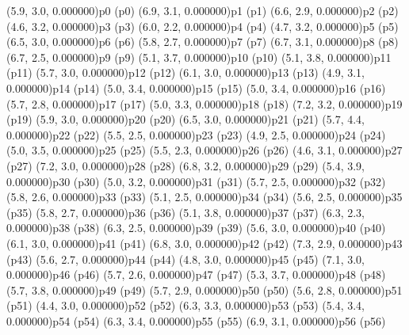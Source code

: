 \psPoint(5.9, 3.0, 0.000000){p0}
\psdot(p0)
\psPoint(6.9, 3.1, 0.000000){p1}
\psdot(p1)
\psPoint(6.6, 2.9, 0.000000){p2}
\psdot(p2)
\psPoint(4.6, 3.2, 0.000000){p3}
\psdot(p3)
\psPoint(6.0, 2.2, 0.000000){p4}
\psdot(p4)
\psPoint(4.7, 3.2, 0.000000){p5}
\psdot(p5)
\psPoint(6.5, 3.0, 0.000000){p6}
\psdot(p6)
\psPoint(5.8, 2.7, 0.000000){p7}
\psdot(p7)
\psPoint(6.7, 3.1, 0.000000){p8}
\psdot(p8)
\psPoint(6.7, 2.5, 0.000000){p9}
\psdot(p9)
\psPoint(5.1, 3.7, 0.000000){p10}
\psdot(p10)
\psPoint(5.1, 3.8, 0.000000){p11}
\psdot(p11)
\psPoint(5.7, 3.0, 0.000000){p12}
\psdot(p12)
\psPoint(6.1, 3.0, 0.000000){p13}
\psdot(p13)
\psPoint(4.9, 3.1, 0.000000){p14}
\psdot(p14)
\psPoint(5.0, 3.4, 0.000000){p15}
\psdot(p15)
\psPoint(5.0, 3.4, 0.000000){p16}
\psdot(p16)
\psPoint(5.7, 2.8, 0.000000){p17}
\psdot(p17)
\psPoint(5.0, 3.3, 0.000000){p18}
\psdot(p18)
\psPoint(7.2, 3.2, 0.000000){p19}
\psdot(p19)
\psPoint(5.9, 3.0, 0.000000){p20}
\psdot(p20)
\psPoint(6.5, 3.0, 0.000000){p21}
\psdot(p21)
\psPoint(5.7, 4.4, 0.000000){p22}
\psdot(p22)
\psPoint(5.5, 2.5, 0.000000){p23}
\psdot(p23)
\psPoint(4.9, 2.5, 0.000000){p24}
\psdot(p24)
\psPoint(5.0, 3.5, 0.000000){p25}
\psdot(p25)
\psPoint(5.5, 2.3, 0.000000){p26}
\psdot(p26)
\psPoint(4.6, 3.1, 0.000000){p27}
\psdot(p27)
\psPoint(7.2, 3.0, 0.000000){p28}
\psdot(p28)
\psPoint(6.8, 3.2, 0.000000){p29}
\psdot(p29)
\psPoint(5.4, 3.9, 0.000000){p30}
\psdot(p30)
\psPoint(5.0, 3.2, 0.000000){p31}
\psdot(p31)
\psPoint(5.7, 2.5, 0.000000){p32}
\psdot(p32)
\psPoint(5.8, 2.6, 0.000000){p33}
\psdot(p33)
\psPoint(5.1, 2.5, 0.000000){p34}
\psdot(p34)
\psPoint(5.6, 2.5, 0.000000){p35}
\psdot(p35)
\psPoint(5.8, 2.7, 0.000000){p36}
\psdot(p36)
\psPoint(5.1, 3.8, 0.000000){p37}
\psdot(p37)
\psPoint(6.3, 2.3, 0.000000){p38}
\psdot(p38)
\psPoint(6.3, 2.5, 0.000000){p39}
\psdot(p39)
\psPoint(5.6, 3.0, 0.000000){p40}
\psdot(p40)
\psPoint(6.1, 3.0, 0.000000){p41}
\psdot(p41)
\psPoint(6.8, 3.0, 0.000000){p42}
\psdot(p42)
\psPoint(7.3, 2.9, 0.000000){p43}
\psdot(p43)
\psPoint(5.6, 2.7, 0.000000){p44}
\psdot(p44)
\psPoint(4.8, 3.0, 0.000000){p45}
\psdot(p45)
\psPoint(7.1, 3.0, 0.000000){p46}
\psdot(p46)
\psPoint(5.7, 2.6, 0.000000){p47}
\psdot(p47)
\psPoint(5.3, 3.7, 0.000000){p48}
\psdot(p48)
\psPoint(5.7, 3.8, 0.000000){p49}
\psdot(p49)
\psPoint(5.7, 2.9, 0.000000){p50}
\psdot(p50)
\psPoint(5.6, 2.8, 0.000000){p51}
\psdot(p51)
\psPoint(4.4, 3.0, 0.000000){p52}
\psdot(p52)
\psPoint(6.3, 3.3, 0.000000){p53}
\psdot(p53)
\psPoint(5.4, 3.4, 0.000000){p54}
\psdot(p54)
\psPoint(6.3, 3.4, 0.000000){p55}
\psdot(p55)
\psPoint(6.9, 3.1, 0.000000){p56}
\psdot(p56)
